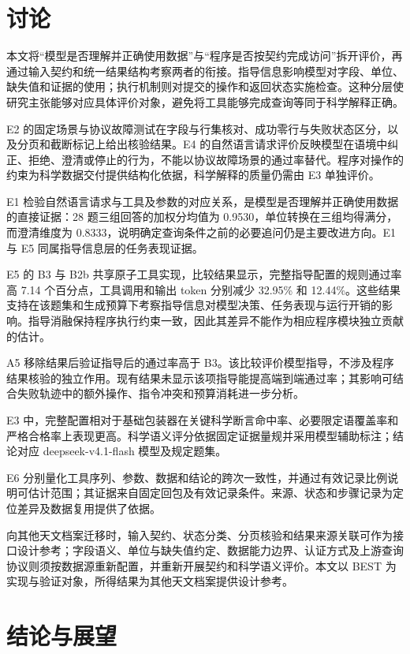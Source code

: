 \documentclass{dcfp}
\begin{document}
\begin{PaperBody}
\section{讨论}

本文将“模型是否理解并正确使用数据”与“程序是否按契约完成访问”拆开评价，再通过输入契约和统一结果结构考察两者的衔接。指导信息影响模型对字段、单位、缺失值和证据的使用；执行机制则对提交的操作和返回状态实施检查。这种分层使研究主张能够对应具体评价对象，避免将工具能够完成查询等同于科学解释正确。

E2 的固定场景与协议故障测试在字段与行集核对、成功零行与失败状态区分，以及分页和截断标记上给出核验结果。E4 的自然语言请求评价反映模型在语境中纠正、拒绝、澄清或停止的行为，不能以协议故障场景的通过率替代。程序对操作的约束为科学数据交付提供结构化依据，科学解释的质量仍需由 E3 单独评价。

E1 检验自然语言请求与工具及参数的对应关系，是模型是否理解并正确使用数据的直接证据：28 题三组回答的加权分均值为 0.9530，单位转换在三组均得满分，而澄清维度为 0.8333，说明确定查询条件之前的必要追问仍是主要改进方向。E1 与 E5 同属指导信息层的任务表现证据。

E5 的 B3 与 B2b 共享原子工具实现，比较结果显示，完整指导配置的规则通过率高 7.14 个百分点，工具调用和输出 token 分别减少 32.95\% 和 12.44\%。这些结果支持在该题集和生成预算下考察指导信息对模型决策、任务表现与运行开销的影响。指导消融保持程序执行约束一致，因此其差异不能作为相应程序模块独立贡献的估计。

A5 移除结果后验证指导后的通过率高于 B3。该比较评价模型指导，不涉及程序结果核验的独立作用。现有结果未显示该项指导能提高端到端通过率；其影响可结合失败轨迹中的额外操作、指令冲突和预算消耗进一步分析。

E3 中，完整配置相对于基础包装器在关键科学断言命中率、必要限定语覆盖率和严格合格率上表现更高。科学语义评分依据固定证据量规并采用模型辅助标注；结论对应 deepseek-v4.1-flash 模型及规定题集。

E6 分别量化工具序列、参数、数据和结论的跨次一致性，并通过有效记录比例说明可估计范围；其证据来自固定回包及有效记录条件。来源、状态和步骤记录为定位差异及数据复用提供了依据。

向其他天文档案迁移时，输入契约、状态分类、分页核验和结果来源关联可作为接口设计参考；字段语义、单位与缺失值约定、数据能力边界、认证方式及上游查询协议则须按数据源重新配置，并重新开展契约和科学语义评价。本文以 BEST 为实现与验证对象，所得结果为其他天文档案提供设计参考。

\section{结论与展望}


\end{PaperBody}
\end{document}
